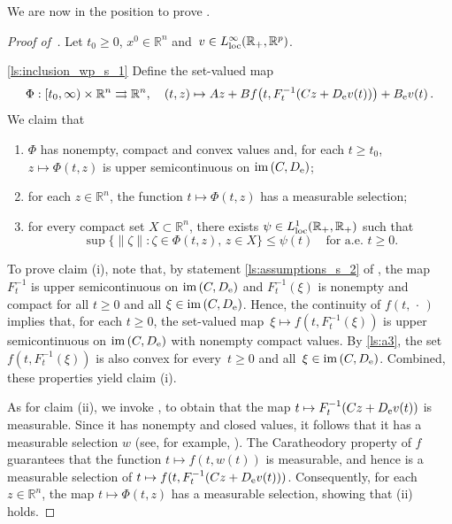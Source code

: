 \documentclass[a4paper,11pt]{article}
\newcommand{\mR}{\mathbb R}
\newcommand{\R}{\mathbb R}
\numberwithin{equation}{section}
\numberwithin{figure}{section}
\numberwithin{table}{section}
\begin{document}
%
We are now in the position to prove .
%
\begin{proof}[Proof of~]
Let $t_0\geq 0$, $x^0\in\R^n$ and~$v\in L^\infty_{\rm loc}(\R_+,\R^p)$.

\ref{ls:inclusion_wp_s_1} Define the set-valued map
\[ \Phi:[t_0,\infty)\times\R^n \rightrightarrows  \mR^n, \quad (t,z)\mapsto Az+Bf\big(t,F_t^{-1}(Cz+D_{\rm e}v(t))\big)+B_{\rm e}v(t)\,.\]
We claim that
\begin{enumerate}[label = (\roman*)]
    \item $\Phi$ has nonempty, compact and convex values and, for each $t\geq t_0$, $z\mapsto
     \Phi(t,z)$ is upper semicontinuous on ${\rm im}\,(C,D_{\rm e})$;
    \item  for each $z\in\R^n$, the function $t\mapsto\Phi(t,z)$ has a measurable selection;
    \item for every compact set $X\subset\R^n$, there exists $\psi\in L^1_{\rm loc}(\R_+,\R_+)$ such that
        \[
        \sup\{\|\zeta\|:\zeta\in\Phi(t,z),\,z\in X\}\leq\psi(t)\quad\mbox{for a.e. $t\geq 0$.}
        \]
\end{enumerate}
To prove claim (i), note that, by statement \ref{ls:assumptions_s_2} of , the map $F_t^{-1}$ is upper semicontinuous on ${\rm im}\,(C,D_{\rm e})$
and $F_t^{-1}(\xi)$ is nonempty and compact for all $t\geq 0$ and all $\xi\in {\rm im}\,(C,D_{\rm e})$. Hence, the continuity of $f(t,\,\cdot\,)$ implies that, for each $t\geq 0$, the set-valued map~$\xi\mapsto f(t, F_t^{-1}(\xi))$ is upper semicontinuous on ${\rm im}\,(C,D_{\rm e})$ with nonempty compact values. By \ref{ls:a3}, the set~$f(t,F_t^{-1}(\xi))$ is also convex for every~$t\geq 0$ and all~$\xi\in {\rm im}\,(C,D_{\rm e})$. Combined, these properties yield claim (i).

As for claim (ii), we invoke , to obtain that the map $t\mapsto F_t^{-1}(Cz+D_{\rm e}v(t))$ is measurable. Since it has nonempty and closed values, it follows that it has a measurable selection $w$ (see, for example, \cite[Proposition 3.2]{d92}). The Caratheodory property of $f$ guarantees that the function $t\mapsto f(t,w(t))$ is measurable, and hence is a measurable selection of $t\mapsto f(t,F_t^{-1}(Cz+D_{\rm e}v(t)))$. Consequently, for each $z\in\R^n$, the map $t\mapsto\Phi(t,z)$ has a measurable selection, showing that (ii) holds.


\end{proof}
\end{document}
